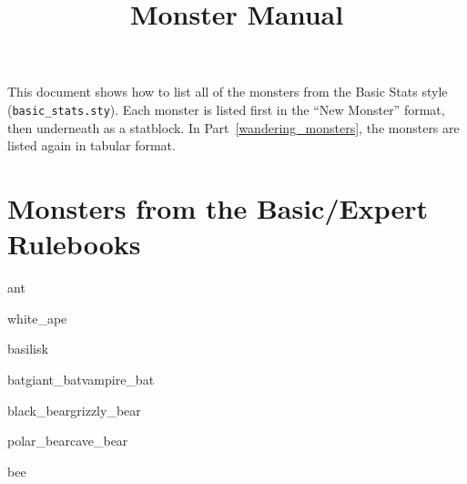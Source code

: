 \documentclass[a4paper,serif]{rpg_module}
\begin{document}
\raggedbottom

\title{Monster Manual}

\showtitle

This document shows how to list all of the monsters from the Basic Stats style (\verb|basic_stats.sty|).
Each monster is listed first in the ``New Monster'' format, then underneath as a statblock. In
Part~\ref{wandering_monsters}, the monsters are listed again in tabular format.

\part{Monsters from the Basic/Expert Rulebooks}

\begin{newmonster}{ant}
\lipsum[1]
\end{newmonster}

\begin{newmonster}{white_ape}\end{newmonster}

\begin{newmonster}{basilisk}\end{newmonster}



\begin{newmonster3}{bat}{giant_bat}{vampire_bat}
\lipsum[1]
\end{newmonster3}


\begin{newmonster2}{black_bear}{grizzly_bear}\end{newmonster2}
\begin{newmonster2*}{polar_bear}{cave_bear}{}{}\lipsum[2]\end{newmonster2*}

\begin{newmonster}{bee}\end{newmonster}
\end{document}
